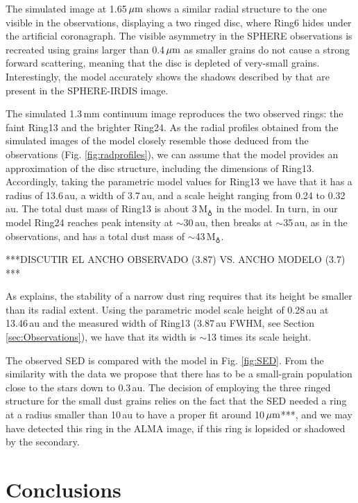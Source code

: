 \documentclass[letters,usenatbib,times]{mnras}
\begin{document}
The simulated image at 1.65\,$\hbox{$\mu$m}$ shows a similar radial structure to the one visible in the observations, displaying a two ringed disc, where Ring6 hides under the artificial coronagraph. The visible asymmetry in the SPHERE observations is recreated using grains larger than 0.4\,$\hbox{$\mu$m}$ as smaller grains do not cause a strong forward scattering, meaning that the disc is depleted of very-small grains. Interestingly, the model accurately shows the shadows described by \citet{dOrazi} that are present in the SPHERE-IRDIS image.

The simulated 1.3\,mm continuum image  reproduces the two observed rings: the faint Ring13 and the  brighter Ring24. As the radial profiles obtained from the simulated images of the model closely resemble those deduced from the observations (Fig. \ref{fig:radprofiles}), we can assume that the model provides an approximation of the disc structure, including the dimensions of  Ring13. Accordingly, taking the parametric model values for Ring13 we have that it has a radius of  13.6\,au,  a  width of 3.7\,au, and a  scale height ranging from 0.24 to 0.32\,au. The total dust mass of Ring13 is  about 3\,M$_{\earth}$ in the model.  In turn, in our model Ring24 reaches peak intensity at $\sim$30\,au, then  breaks  at $\sim$35\,au, as in the observations, and has a total dust  mass of $\sim$43\,M$_{\earth}$. 

***DISCUTIR EL ANCHO OBSERVADO (3.87) VS. ANCHO MODELO (3.7) *** 

As \citet{2018ApJ...869L..46D} explains, the stability of a narrow dust ring requires that its  height be smaller than its  radial extent. Using the parametric model scale height of 0.28\,au at 13.46\,au and the measured width of Ring13 (3.87\,au FWHM, see Section \ref{sec:Observations}), we have that its width is $\sim$13 times its scale height.

The observed SED is compared with the model in Fig. \ref{fig:SED}. From the similarity with the data we propose that there has to be a small-grain population close to the stars down to 0.3\,au. The decision of employing the three ringed structure for the small dust grains relies on the fact that the SED needed a ring at a radius smaller than 10\,au to have a proper fit around 10\,$\hbox{$\mu$m}$***, and we may have detected this ring in the ALMA image, if this ring is lopsided or shadowed by the secondary. 


\section{Conclusions} \label{sec:Conclusions}
\end{document}
